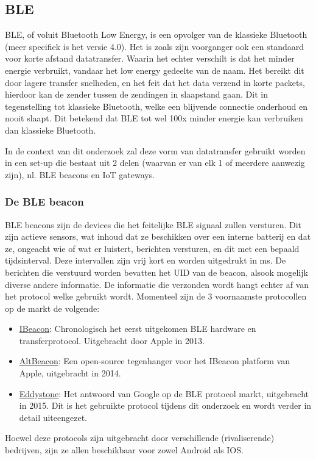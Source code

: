 \subsection{BLE}
\label{subsec:lit-ble}
BLE, of voluit Bluetooth Low Energy, is een opvolger van de klassieke Bluetooth (meer specifiek is het versie 4.0). Het is zoals zijn voorganger ook een standaard voor korte afstand datatransfer. Waarin het echter verschilt is dat het minder energie verbruikt, vandaar het low energy gedeelte van de naam. Het bereikt dit door lagere transfer snelheden, en het feit dat het data verzend in korte packets, hierdoor kan de zender tussen de zendingen in slaapstand gaan. Dit in tegenstelling tot klassieke Bluetooth, welke een blijvende connectie onderhoud en nooit slaapt. Dit betekend dat BLE tot wel 100x minder energie kan verbruiken dan klassieke Bluetooth. \autocite{Nesbo2021}

In de context van dit onderzoek zal deze vorm van datatransfer gebruikt worden in een set-up die bestaat uit 2 delen (waarvan er van elk 1 of meerdere aanwezig zijn), nl. BLE beacons en IoT gateways.

\subsubsection{De BLE beacon}
BLE beacons zijn de devices die het feitelijke BLE signaal zullen versturen. Dit zijn actieve sensors, wat inhoud dat ze beschikken over een interne batterij en dat ze, ongeacht wie of wat er luistert, berichten versturen, en dit met een bepaald tijdsinterval. Deze intervallen zijn vrij kort en worden uitgedrukt in ms.\autocite{Adarsh2022}
De berichten die verstuurd worden bevatten het UID van de beacon, alsook mogelijk diverse andere informatie. De informatie die verzonden wordt hangt echter af van het protocol welke gebruikt wordt. Momenteel zijn de 3 voornaamste protocollen op de markt de volgende:
\begin{itemize}
	\item \underline{IBeacon}:
	Chronologisch het eerst uitgekomen BLE hardware en transferprotocol. Uitgebracht door Apple in 2013. 
	\item \underline{AltBeacon}:
	Een open-source tegenhanger voor het IBeacon platform van Apple, uitgebracht in 2014.
	\item \underline{Eddystone}:
	Het antwoord van Google op de BLE protocol markt, uitgebracht in 2015. Dit is het gebruikte protocol tijdens dit onderzoek en wordt verder in detail uiteengezet.
\end{itemize}
Hoewel deze protocols zijn uitgebracht door verschillende (rivaliserende) bedrijven, zijn ze allen beschikbaar voor zowel Android als IOS.\autocite{Smart2022}

